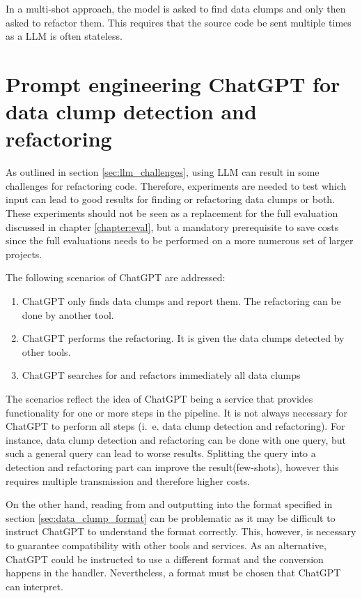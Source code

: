 In a multi-shot approach, the model is asked to find data clumps and only then asked to refactor them. This requires that the source code be sent multiple times as a \ac{LLM} is often stateless. 

\section{Prompt engineering ChatGPT for data clump detection and refactoring}\label{sec:prompt_engineering_impl}

As outlined in  section \ref{sec:llm_challenges}, using \ac{LLM} can result in some challenges for refactoring code. Therefore, experiments are needed to test which input can lead to good results for finding or refactoring data clumps or both. These experiments should not be seen as a replacement for the full evaluation discussed in chapter \ref{chapter:eval}, but a mandatory prerequisite to save costs since the full evaluations needs to be performed on a more numerous set of larger projects.

The following scenarios of ChatGPT are addressed:
\begin{enumerate}
    \item ChatGPT only finds data clumps and report them. The refactoring can be done by another tool.
    \item ChatGPT performs the refactoring. It is given the data clumps detected by other tools. 
    \item ChatGPT searches for and refactors immediately all data clumps
\end{enumerate}

The scenarios reflect the idea of ChatGPT being a service that provides functionality for one or more steps in the pipeline. It is not always necessary for ChatGPT to perform all steps (i.~e.  data clump detection and refactoring). For instance, data clump detection and refactoring can be done with one query, but such a general query can lead to worse  results. Splitting the query into a detection and refactoring part can improve the result(few-shots), however this requires multiple transmission and therefore higher costs. 

On the other hand, reading from and outputting into the format specified in section \ref{sec:data_clump_format} can be problematic as it may be difficult to instruct ChatGPT to understand the format correctly. This, however, is necessary to guarantee compatibility with other tools and services.  As an alternative, ChatGPT could be instructed to use a different format and the conversion happens in the handler. Nevertheless, a format must be chosen that ChatGPT can interpret. 

